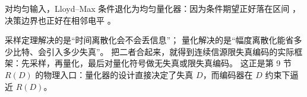 \begin{yourturn}
对均匀输入，Lloyd--Max 条件退化为均匀量化器：因为条件期望正好落在区间
，决策边界也正好在相邻电平 。
\workspace[2]
\end{yourturn}

\begin{strand}
采样定理解决的是“时间离散化会不会丢信息”；
量化解决的是“幅度离散化能省多少比特、会引入多少失真”。
把二者合起来，就得到连续信源限失真编码的实际框架：先采样，再量化，最后对量化符号做无失真或限失真编码。
这正是第 9 节 $R(D)$ 的物理入口：量化器的设计直接决定了失真 $D$，而编码器在 $D$ 约束下逼近 $R(D)$。
\end{strand}

